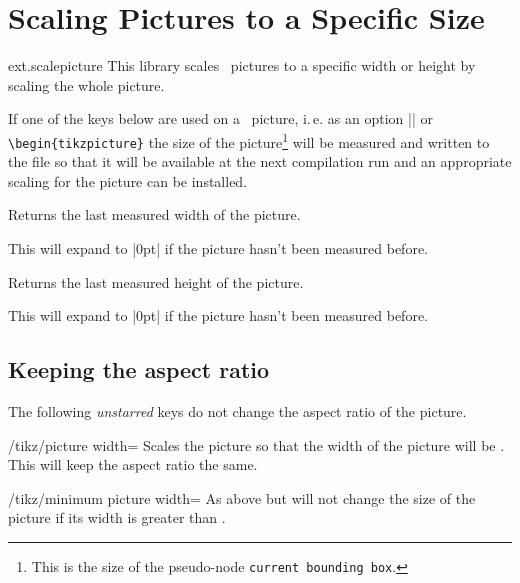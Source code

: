 %
%
%
\clearpage
\section{Scaling Pictures to a Specific Size}
\label{library:scalepicture}

\begin{tikzlibrary}{ext.scalepicture}
  This library scales \tikzname\ pictures to a specific width or height
  by scaling the whole picture.
\end{tikzlibrary}

\begin{multicols}{2}
If one of the keys below are used on a \tikzname\ picture, i.\,e.
as an option |\tikzpicture| or \texttt{\textbackslash begin\{tikzpicture\}}
the size of the picture\footnote{This is the size of the pseudo-node \texttt{current bounding box}.}
will be measured and written to the  file
so that it will be available at the next compilation run
and an appropriate scaling for the picture can be installed.

\begin{command}{\tikzextpicturewidth}
  Returns the last measured width of the picture.
  
  This will expand to |0pt| if the picture hasn't been measured before.
\end{command}
\begin{command}{\tikzextpictureheight}
  Returns the last measured height of the picture.
  
  This will expand to |0pt| if the picture hasn't been measured before.
\end{command}

\subsection{Keeping the aspect ratio}
The following \emph{unstarred} keys do not change the aspect ratio of the picture.

\begin{key}{/tikz/picture width=}
  Scales the picture so that the width of the picture will be .
  This will keep the aspect ratio the same.
\end{key}

\begin{key}{/tikz/minimum picture width=}
  As above but will not change the size of the picture
  if its width is greater than .
\end{key}


\end{multicols}
